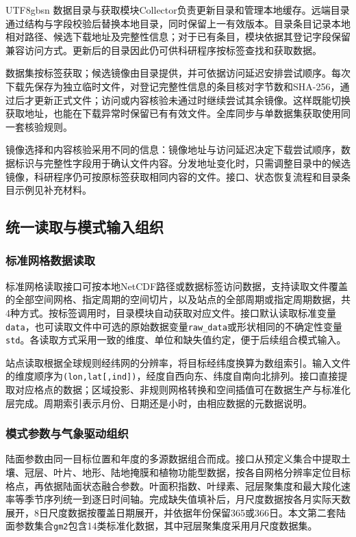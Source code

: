 \documentclass[numdoi]{chinese}
\begin{document}
\begin{CJK}{UTF8}{gbsn}
数据目录与获取模块Collector负责更新目录和管理本地缓存。远端目录通过结构与字段校验后替换本地目录，同时保留上一有效版本。目录条目记录本地相对路径、候选下载地址及完整性信息；对于已有条目，模块依据其登记字段保留兼容访问方式。更新后的目录因此仍可供科研程序按标签查找和获取数据。

数据集按标签获取；候选镜像由目录提供，并可依据访问延迟安排尝试顺序。每次下载先保存为独立临时文件，对登记完整性信息的条目核对字节数和SHA-256，通过后才更新正式文件；访问或内容核验未通过时继续尝试其余镜像。这样既能切换获取地址，也能在下载异常时保留已有有效文件。全库同步与单数据集获取使用同一套核验规则。

镜像选择和内容核验采用不同的信息：镜像地址与访问延迟决定下载尝试顺序，数据标识与完整性字段用于确认文件内容。分发地址变化时，只需调整目录中的候选镜像，科研程序仍可按原标签获取相同内容的文件。接口、状态恢复流程和目录条目示例见补充材料。

\subsection{统一读取与模式输入组织}
\subsubsection{标准网格数据读取}
标准网格读取接口可按本地NetCDF路径或数据标签访问数据，支持读取文件覆盖的全部空间网格、指定周期的空间切片，以及站点的全部周期或指定周期数据，共4种方式。按标签调用时，目录模块自动获取对应文件。接口默认读取标准变量\nolinkurl{data}，也可读取文件中可选的原始数据变量\nolinkurl{raw_data}或形状相同的不确定性变量\nolinkurl{std}。各读取方式采用一致的维度、单位和缺失值约定，便于后续组合模式输入。

站点读取根据全球规则经纬网的分辨率，将目标经纬度换算为数组索引。输入文件的维度顺序为\nolinkurl{(lon,lat[,ind])}，经度自西向东、纬度自南向北排列。接口直接提取对应格点的数据；区域投影、非规则网格转换和空间插值可在数据生产与标准化层完成。周期索引表示月份、日期还是小时，由相应数据的元数据说明。

\subsubsection{模式参数与气象驱动组织}
陆面参数由同一目标位置和年度的多源数据组合而成。接口从预定义集合中提取土壤、冠层、叶片、地形、陆地掩膜和植物功能型数据，按各自网格分辨率定位目标格点，再依据陆面状态融合参数。叶面积指数、叶绿素、冠层聚集度和最大羧化速率等季节序列统一到逐日时间轴。完成缺失值填补后，月尺度数据按各月实际天数展开，8日尺度数据按覆盖日期展开，并依据年份保留365或366日。本文第二套陆面参数集合\nolinkurl{gm2}包含14类标准化数据，其中冠层聚集度采用月尺度数据集。


\end{CJK}
\end{document}
